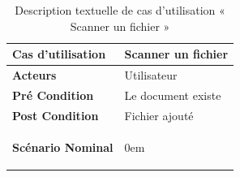 \begin{longtable}{|p{5cm}|p{10cm}|}
  \caption{Description textuelle de cas d'utilisation « Scanner un fichier »} \label{tab:DescriptionTextuelleDeCasDUtilisationScannerUnFichier} \\

\hline
\textbf{Cas d'utilisation}&Scanner un fichier\\
\hline
\textbf{Acteurs}&Utilisateur\\
\hline
\textbf{Pré Condition}&Le document existe\\
\hline
\textbf{Post Condition}&Fichier ajouté\\
\hline
\textbf{Scénario Nominal}&
\vspace{-\baselineskip}
\begin{enumerate}
    \setcounter{enumi}{1}
    \itemsep0em 


\end{enumerate}
\end{longtable}
